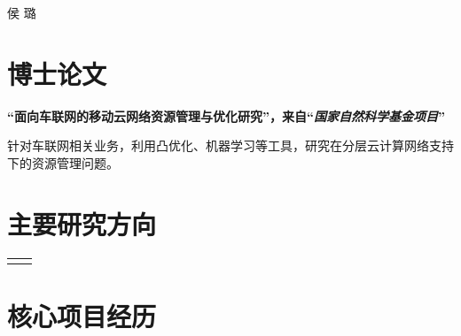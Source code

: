 \documentclass[10pt]{article} %
\begin{document}
\begin{paracol}{2} %
	
	
	\parbox[top][0.12\textheight][c]{\linewidth}{ %
		\vspace{-0.04\textheight} %
		\centering %
		{\Huge 侯 璐}\faMars\\\medskip %
		{\Huge{}}
	}
	
	\section{博士论文}

	{\raggedright\textbf{``面向车联网的移动云网络资源管理与优化研究''，来自``\textit{国家自然科学基金项目}''}\\\medskip}
	针对车联网相关业务，利用凸优化、机器学习等工具，研究在分层云计算网络支持下的资源管理问题。
	
	
	\medskip %
	\section{主要研究方向}
	
	\begin{supertabular}{rl}
	\end{supertabular}
	\section{核心项目经历}
	

\end{paracol}
\end{document}
